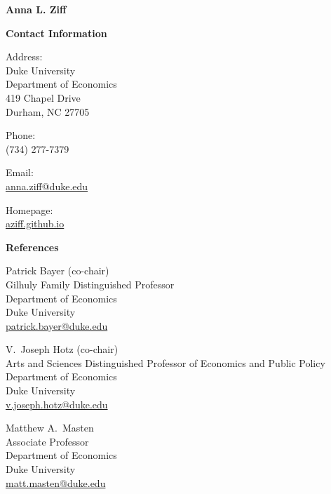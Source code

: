 \documentclass[12pt]{article}
\begin{document}
\setlength{\parindent}{0em}


\vspace{-5cm}
{\Large \textbf{Anna L. Ziff}} \\



\begin{multicols}{2}

\textbf{Contact Information} 

\vspace{1em}

Address: \\
Duke University \\ 
Department of Economics \\ 
419 Chapel Drive \\ 
Durham, NC 27705 \\ 

\vspace{1em}

Phone: \\
(734) 277-7379

\vspace{1em}

Email: \\
\href{mailto:anna.ziff@duke.edu}{anna.ziff@duke.edu}  

\vspace{1em}

Homepage: \\
\href{https://aziff.github.io}{aziff.github.io} 

\columnbreak

\textbf{References} 

\vspace{1em}

Patrick Bayer (co-chair) \\ 
Gilhuly Family Distinguished Professor \\ 
Department of Economics \\ 
Duke University \\ 
\href{mailto:patrick.bayer@duke.edu}{patrick.bayer@duke.edu}

\vspace{1em}

V.\ Joseph Hotz (co-chair) \\ 
Arts and Sciences Distinguished Professor of 
Economics and Public Policy \\ 
Department of Economics \\ 
Duke University \\ 
\href{mailto:v.joseph.hotz@duke.edu}{v.joseph.hotz@duke.edu}

\vspace{1em}

Matthew A.\ Masten \\ 
Associate Professor \\ 
Department of Economics \\ 
Duke University \\ 
\href{mailto:matt.masten@duke.edu}{matt.masten@duke.edu}
\end{multicols}
\end{document}
